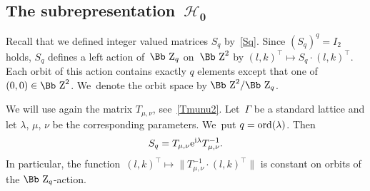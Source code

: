 \documentclass[pdftex]{sigma}
\newcommand\ZZ{{\mbox{\Bb Z}}}
\newcommand\cH{{\mathcal H}}
\newcommand{\ord}{{\rm ord}}
\numberwithin{equation}{section}
\begin{document}
%
\subsection[The subrepresentation~$\cH_0$]{The subrepresentation~$\boldsymbol{\cH_0}$}
Recall that we defined integer valued matrices $S_q$ by~\eqref{Sq}. Since $(S_q)^q=I_2$ holds, $S_q$ defines a left action of~$\ZZ_q$ on~$\ZZ^2$ by $(l,k)^\top\mapsto S_q\cdot(l,k)^\top$. Each orbit of this action contains exactly $q$ elements except that one of~$(0,0)\in\ZZ^2$. We~denote the orbit space by $\ZZ^2/\ZZ_q$.

We will use again the matrix $T_{\mu,\nu}$, see~\eqref{Tmunu2}. Let~$\Gamma$ be a standard lattice and let $\lambda$, $\mu$, $\nu$ be the corresponding parameters. We~put $q=\ord(\lambda)$. Then
\begin{gather}\label{sq}
S_q=T_{\mu,\nu}{\rm e}^{{\rm i}\lambda}T_{\mu,\nu}^{-1}.
\end{gather}
In particular, the function~$(l,k)^\top\mapsto \big\|T_{\mu,\nu}^{-1}\cdot(l,k)^\top\big\|$ is constant on orbits of the $\ZZ_q$-action.
\end{document}
